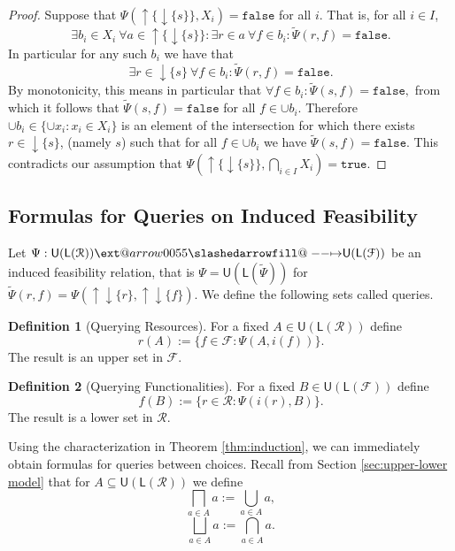 \documentclass[12pt]{article}
\makeatletter
\theoremstyle{definition}
\newtheorem{definition}{Definition}[section]
\theoremstyle{plain}
\theoremstyle{plain}
\theoremstyle{plain}
\theoremstyle{plain}
\theoremstyle{remark}
\theoremstyle{remark}
\newcommand{\mc}[1]{\mathcal{#1}}
\newcommand{\sub}{\subseteq}
\newcommand{\low}{\mathsf{L}}
\newcommand{\upper}{\mathsf{U}}
\newcommand{\true}{\mathtt{true}}
\newcommand{\false}{\mathtt{false}}
\newcommand{\upc}[1]{{\uparrow #1}}
\newcommand{\lwc}[1]{{\downarrow #1}}
\def\slashedarrowfill@#1#2#3#4#5{%
	$\m@th\thickmuskip0mu\medmuskip\thickmuskip\thinmuskip\thickmuskip
	\relax#5#1\mkern-7mu%
	\cleaders\hbox{$#5\mkern-2mu#2\mkern-2mu$}\hfill
	\mathclap{#3}\mathclap{#2}%
	\cleaders\hbox{$#5\mkern-2mu#2\mkern-2mu$}\hfill
	\mkern-7mu#4$%
}
\def\rightslashedarrowfill@{%
	\slashedarrowfill@\relbar\relbar\mapstochar\rightarrow}
\newcommand\xslashedrightarrow[2][]{%
	\ext@arrow 0055{\rightslashedarrowfill@}{#1}{#2}}
\makeatother
\begin{document}
\begin{proof}
	Suppose that $\Psi(\upc{\{\lwc{\{s\}}\}},X_i) = \false$ for all $i$. That is, for all $i \in I$,
	$$\exists b_i \in X_i \: \forall a \in \upc{\{\lwc{\{s\}}\}}: \exists r \in a \: \forall f \in b_i: \tilde\Psi(r,f) = \false.$$
	In particular for any such $b_i$ we have that
	$$\exists r \in \lwc{\{s\}} \: \forall f \in b_i: \tilde\Psi(r,f) = \false.$$
	By monotonicity, this means in particular that $\forall f \in b_i: \tilde\Psi(s,f) = \false,$
	from which it follows that $\tilde\Psi(s,f) = \false$ for all $f \in \cup b_i$.
	Therefore $\cup b_i \in \{ \cup x_i : x_i \in X_i \}$ is an element of the intersection for which there exists $r \in \lwc{\{s\}}$, (namely $s$) such that for all $f \in \cup b_i$ we have $\tilde\Psi(s,f) = \false$. This contradicts our assumption that $\Psi(\upc{\{\lwc{\{s\}}\}}, \bigcap_{i \in I}X_i) = \true$.
\end{proof}

\subsection{Formulas for Queries on Induced Feasibility}
Let $\Psi: \upper(\low(\mc{R})) \xslashedrightarrow{} \upper(\low(\mc{F}))$ be an induced feasibility relation, that is $\Psi = \upper(\low(\tilde\Psi))$ for $\tilde\Psi(r,f) = \Psi(\upc{\lwc{\{r\}}},\upc{\lwc{\{f\}}})$. We define the following sets called queries. 

\begin{definition}[Querying Resources]
	For a fixed $A \in \upper(\low(\mc{R}))$ define 
	$$r(A) := \{f \in \mc{F} : \Psi(A,i(f)) \}.$$
	The result is an upper set in $\mc{F}$.
\end{definition}

\begin{definition}[Querying Functionalities]
	For a fixed $B \in \upper(\low(\mc{F}))$ define 
	$$f(B) := \{r \in \mc{R} : \Psi(i(r),B) \}.$$
	The result is a lower set in $\mc{R}$.
\end{definition}

Using the characterization in Theorem \ref{thm:induction}, we can immediately obtain formulas for queries between choices. Recall from Section \ref{sec:upper-lower model} that for $A \sub \upper(\low(\mc{R}))$ we define
$$ \bigsqcap_{a \in A} a :=  \bigcup_{a \in A} a,$$
$$ \bigsqcup_{a \in A} a := \bigcap_{a \in A} a.$$
\end{document}
